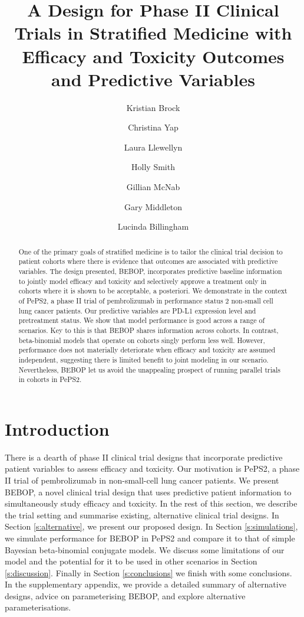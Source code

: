 \documentclass[alpha-refs]{wiley-article}
\title{A Design for Phase II Clinical Trials in Stratified Medicine with Efficacy and Toxicity Outcomes and Predictive Variables}
\author[1]{Kristian Brock}
\author[1]{Christina Yap}
\author[1]{Laura Llewellyn}
\author[1]{Holly Smith}
\author[1]{Gillian McNab}
\author[2\authfn{2}]{Gary Middleton}
\author[1\authfn{2}]{Lucinda Billingham}
\affil[1]{Cancer Research UK Clinical Trials Unit, University of Birmingham, Birmingham, B15 2TT, UK}
\affil[2]{Institute of Immunology and Immunotherapy, University of Birmingham, Birmingham, B15 2TT, UK}
\begin{document}
\maketitle

\begin{abstract}
One of the primary goals of stratified medicine is to tailor the clinical trial decision to patient cohorts where there is evidence that outcomes are associated with predictive variables.
The design presented, BEBOP, incorporates predictive baseline information to jointly model efficacy and toxicity and selectively approve a treatment only in cohorts where it is shown to be acceptable, a posteriori.
We demonstrate in the context of PePS2, a phase II trial of pembrolizumab in performance status 2 non-small cell lung cancer patients.
Our predictive variables are PD-L1 expression level and pretreatment status. 
We show that model performance is good across a range of scenarios.
Key to this is that BEBOP shares information across cohorts. 
In contrast, beta-binomial models that operate on cohorts singly perform less well.
However, performance does not materially deteriorate when efficacy and toxicity are assumed independent, suggesting there is limited benefit to joint modeling in our scenario.
Nevertheless, BEBOP let us avoid the unappealing prospect of running parallel trials in cohorts in PePS2.


\end{abstract}



\section{Introduction}
\label{s:introduction}
There is a dearth of phase II clinical trial designs that incorporate predictive patient variables to assess efficacy and toxicity.
Our motivation is PePS2, a phase II trial of pembrolizumab in non-small-cell lung cancer patients.
We present BEBOP, a novel clinical trial design that uses predictive patient information to simultaneously study efficacy and toxicity.
In the rest of this section, we describe the trial setting and summarise existing, alternative clinical trial designs.
In Section \ref{s:alternative}, we present our proposed design.
In Section \ref{s:simulations}, we simulate performance for BEBOP in PePS2 and compare it to that of simple Bayesian beta-binomial conjugate models.
We discuss some limitations of our model and the potential for it to be used in other scenarios in Section \ref{s:discussion}.
Finally in Section \ref{s:conclusions} we finish with some conclusions.
In the supplementary appendix, we provide a detailed summary of alternative designs, advice on parameterising BEBOP, and explore alternative parameterisations.
\end{document}
